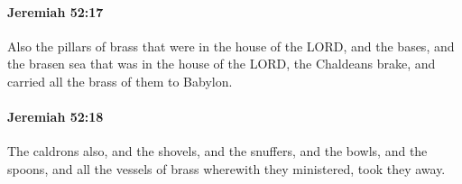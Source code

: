 		\paragraph{Jeremiah 52:17} %
			\label{JEREMIAH-52-17}

			Also the pillars of brass that were in the house of the LORD, and the bases, and the brasen sea that was in the house of the LORD, the Chaldeans brake, and carried all the brass of them to Babylon.


		\paragraph{Jeremiah 52:18} %
			\label{JEREMIAH-52-18}

			The caldrons also, and the shovels, and the snuffers, and the bowls, and the spoons, and all the vessels of brass wherewith they ministered, took they away.


